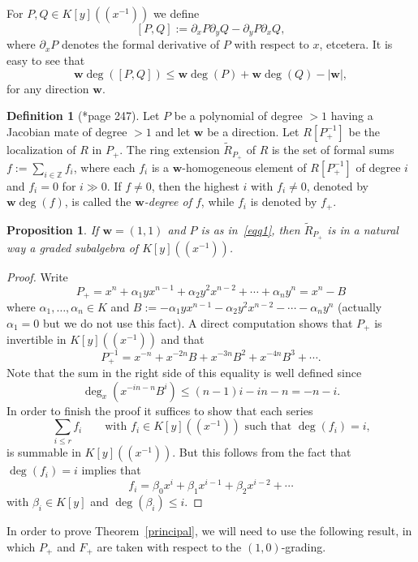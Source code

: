 \documentclass[reqno,a4paper]{amsart}
\newtheorem{proposition}[theorem]{Proposition}
\theoremstyle{definition}
\newtheorem{definition}[theorem]{Definition}
\theoremstyle{remark}
\begin{document}
\smallskip

For $P,Q\in K[y]((x^{-1}))$ we define
$$
[P,Q] := \partial_x P \partial_y Q -  \partial_y P \partial_x Q,
$$
where $\partial_x P$ denotes the formal derivative of $P$ with respect to $x$, etcetera. It is easy to see that
$$
\mathbf{w}\!\deg([P,Q]) \le \mathbf{w}\!\deg(P) + \mathbf{w}\!\deg(Q) - |\mathbf{w}|,
$$
for any direction $\mathbf{w}$.

\begin{definition}[{\cite{vdE}*{page 247}}]\label{extension} Let $P$ be a polynomial of
degree $>1$ having a Jacobian mate of degree $>1$ and let $\mathbf{w}$ be a direction.
Let $R[P_+^{-1}]$ be the localization of $R$ in $P_+$. The ring extension $\tilde R_{P_+}$
of $R$ is the set of formal sums $f := \sum_{i\in \mathds{Z}} f_i$, where each $f_i$ is a
$\mathbf{w}$-homogeneous element of $R[P_+^{-1}]$ of degree $i$ and $f_i = 0$ for $i\gg 0$.
If $f\ne 0$, then the highest $i$ with $f_i\ne 0$, denoted by $\mathbf{w}\!\deg(f)$, is
called the {\em $\mathbf{w}$-degree of $f$}, while $f_i$ is denoted by $f_+$.
\end{definition}

\begin{proposition}\label{calculo de R} If $\mathbf{w}=(1,1)$ and $P$ is as in~\eqref{eqq1},
then $\tilde R_{P_+}$ is in a natural way a graded subalgebra of $K[y]((x^{-1}))$.
\end{proposition}

\begin{proof} Write
$$
P_+ = x^n + \alpha_1 yx^{n-1} + \alpha_2 y^2x^{n-2} +\cdots + \alpha_n y^n = x^n - B
$$
where $\alpha_1,\dots,\alpha_n\in K$ and
$B := - \alpha_1 yx^{n-1} - \alpha_2 y^2x^{n-2} -\cdots - \alpha_n y^n$ (actually $\alpha_1=0$
but we do not use this fact). A direct computation shows that $P_+$ is invertible in
$K[y]((x^{-1}))$ and that
$$
P_+^{-1} = x^{-n} + x^{-2n}B + x^{-3n}B^2 + x^{-4n}B^3 + \cdots.
$$
Note that the sum in the right side of this equality is well defined since
$$
\deg_x(x^{-in-n} B^i) \le (n-1)i - in-n =-n-i.
$$
In order to finish the proof it suffices to show that each series
$$
\sum_{i\le r} f_i\qquad\text{with $f_i\in K[y]((x^{-1}))$ such that $\deg(f_i) = i$,}
$$
is summable in $K[y]((x^{-1}))$. But this follows from the fact that $\deg(f_i) = i$ implies that
$$
f_i = \beta_0 x^i + \beta_1 x^{i-1} + \beta_2 x^{i-2} +\cdots
$$
with $\beta_i\in K[y]$ and $\deg(\beta_i)\le i$.
\end{proof}

In order to prove Theorem~\ref{principal}, we will need to use the following result, in
which $P_+$ and $F_+$ are taken with respect to the $(1,0)$-grading.
\end{document}
